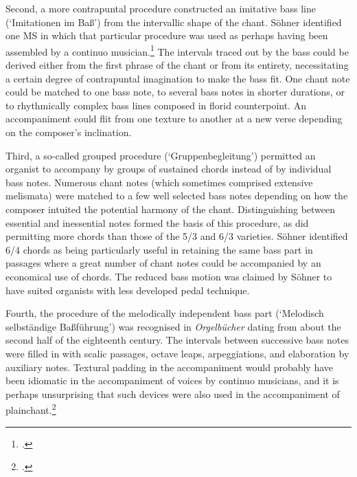 %
Second, a more contrapuntal procedure constructed an imitative bass line (`Imitationen im Baß') from the intervallic shape of the chant.
Söhner identified one MS in which that particular procedure was used as perhaps having been assembled by a continuo musician.\footcite[The MS in question is also described in][66]{FellererCodXXVII841926}
The intervals traced out by the bass could be derived either from the first phrase of the chant or from its entirety, necessitating a certain degree of contrapuntal imagination to make the bass fit.
One chant note could be matched to one bass note, to several bass notes in shorter durations, or to rhythmically complex bass lines composed in florid counterpoint.
An accompaniment could flit from one texture to another at a new verse depending on the composer's inclination.
\noclub[2]

Third, a so-called grouped procedure (`Gruppenbegleitung') permitted an organist to accompany by groups of sustained chords instead of by individual bass notes.
Numerous chant notes (which sometimes comprised extensive melismata) were matched to a few well selected bass notes depending on how the composer intuited the potential harmony of the chant.
Distinguishing between essential and inessential notes formed the basis of this procedure, as did permitting more chords than those of the 5/3 and 6/3 varieties.
Söhner identified 6/4 chords as being particularly useful in retaining the same bass part in passages where a great number of chant notes could be accompanied by an economical use of chords.
The reduced bass motion was claimed by Söhner to have suited organists with less developed pedal technique.

%
Fourth, the procedure of the melodically independent bass part (`Melodisch selbständige Baßführung') was recognised in \emph{Orgelbücher} dating from about the second half of the eighteenth century.
The intervals between successive bass notes were filled in with scalic passages, octave leaps, arpeggiations, and elaboration by auxiliary notes.
Textural padding in the accompaniment would probably have been idiomatic in the accompaniment of voices by continuo musicians, and it is perhaps unsurprising that such devices were also used in the accompaniment of plainchant.\footcites[pp.~44--7, 84--111]{SoehnerGeschichteBegleitunggregorianischen1931}[36--8]{SoehnerOrgelbegleitunggregorianischenGesang1936}

